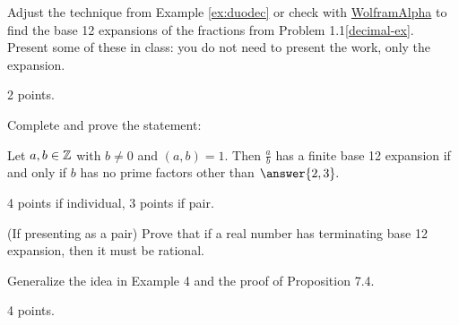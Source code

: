 \documentclass[letterpaper, 11 pt,handout,hints]{ximera}
\begin{document}
\begin{exploration}
\begin{example}
\end{example}

\begin{problem}
 	Adjust the technique from Example \ref{ex:duodec} or check with \href{https://www.wolframalpha.com/input?i=1\%2F11+to+base+12}{WolframAlpha} to find the base 12 expansions of the fractions from Problem 1.1\ref{decimal-ex}. Present some of these in class: you do not need to present the work, only the expansion.
\begin{rubric}
 2 points.
\end{rubric}
 \end{problem}
 
 
\begin{problem}
  	Complete and prove the statement:		
		\begin{conjecture}
 			Let $a,b\in\mathbb Z$ with $b\neq 0$ and $(a,b)=1.$ Then $\frac{a}{b}$ has a finite base 12 expansion if and only if $b$ has no prime factors other than $\answer{2,3}.$
		\end{conjecture}
\begin{rubric}
 4 points if individual, 3 points if pair.
\end{rubric}
\end{problem}

\begin{problem}(If presenting as a pair)
	Prove that if a real number has terminating base 12 expansion, then it must be rational.
\begin{hint}
 Generalize the idea in Example 4 and the proof of Proposition 7.4.
\end{hint}
\begin{rubric}
 4 points.
\end{rubric}
\end{problem}
\end{exploration}
\end{document}
